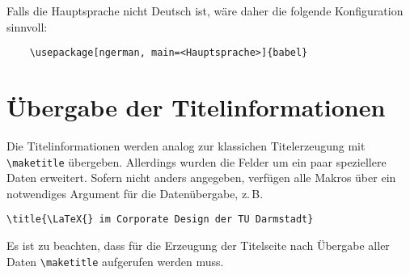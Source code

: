\documentclass[
	ngerman,
	ruledheaders=chapter,%
	class=book,%
	thesis={
		type=dr,
		dr=rernat
	},
	accentcolor=9c,%
	custommargins=true,%
	marginpar=false,%
	fontsize=11pt,%
]{tudapub}
\begin{document}
Falls die Hauptsprache nicht Deutsch ist, wäre daher die folgende Konfiguration sinnvoll:
\begin{verbatim}
	\usepackage[ngerman, main=<Hauptsprache>]{babel}
\end{verbatim}

\section{Übergabe der Titelinformationen}

Die Titelinformationen werden analog zur klassichen Titelerzeugung mit \verb+\maketitle+ übergeben. Allerdings wurden die Felder um ein paar speziellere Daten erweitert. Sofern nicht anders angegeben, verfügen alle Makros über ein notwendiges Argument für die Datenübergabe, z.\,B.
\begin{verbatim}
\title{\LaTeX{} im Corporate Design der TU Darmstadt}
\end{verbatim}
Es ist zu beachten, dass für die Erzeugung der Titelseite nach Übergabe aller Daten \verb+\maketitle+ aufgerufen werden muss.
\end{document}
